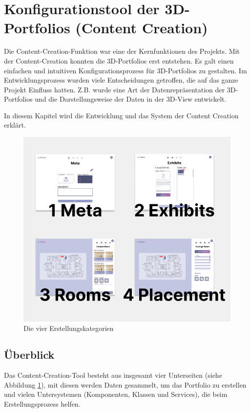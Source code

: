 \section{Konfigurationstool der 3D-Portfolios (Content Creation)} \label{Konfigurationstool}

Die Content-Creation-Funktion war eine der Kernfunktionen des Projekts. Mit der Content-Creation konnten die 3D-Portfolios erst entstehen. Es galt einen einfachen und intuitiven Konfigurationsprozess für 3D-Portfolios zu gestalten. Im Entwicklungsprozess wurden viele Entscheidungen getroffen, die auf das ganze Projekt Einfluss hatten. Z.B. wurde eine Art der Datenrepräsentation der 3D-Portfolios und die Darstellungsweise der Daten in der 3D-View entwickelt.

In diesem Kapitel wird die Entwicklung und das System der Content Creation erklärt.

\begin{figure}[h t]
    \centering
    \includegraphics[scale=0.5]{pics/CreateCreation4Categories.png}
    \caption{Die vier Erstellungskategorien}
    \label{fig:impl:creation:fourCategoires}
\end{figure}

\subsection{Überblick}
Das Content-Creation-Tool besteht aus insgesamt vier Unterseiten (siehe Abbildung \ref{fig:impl:creation:fourCategoires}), mit diesen werden Daten gesammelt, um das Portfolio zu erstellen und vielen Untersystemen (Komponenten, Klassen und Services), die beim Erstellungsprozess helfen.

